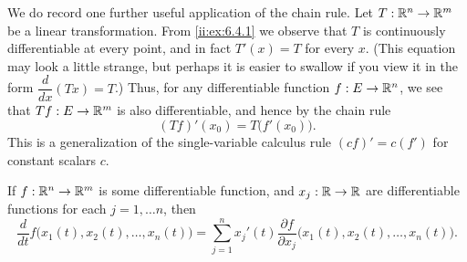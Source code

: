 \begin{note}
  We do record one further useful application of the chain rule.
  Let \(T : \mathbb{R}^n \to \mathbb{R}^m\) be a linear transformation.
  From \cref{ii:ex:6.4.1} we observe that \(T\) is continuously differentiable at every point, and in fact \(T'(x) = T\) for every \(x\).
  (This equation may look a little strange, but perhaps it is easier to swallow if you view it in the form \(\dfrac{d}{dx} (Tx) = T\).)
  Thus, for any differentiable function \(f : E \to \mathbb{R}^n\), we see that \(T f : E \to \mathbb{R}^m\) is also differentiable, and hence by the chain rule
  \[
    (T f)'(x_0) = T\big(f'(x_0)\big).
  \]
  This is a generalization of the single-variable calculus rule \((cf)' = c(f')\) for constant scalars \(c\).
\end{note}

\begin{ac}\label{ii:ac:6.4.1}
  If \(f : \mathbb{R}^n \to \mathbb{R}^m\) is some differentiable function, and \(x_j : \mathbb{R} \to \mathbb{R}\) are differentiable functions for each \(j = 1, \dots n\), then
  \[
    \dfrac{d}{dt} f\big(x_1(t), x_2(t), \dots, x_n(t)\big) = \sum_{j = 1}^n x_j'(t) \dfrac{\partial f}{\partial x_j} \big(x_1(t), x_2(t), \dots, x_n(t)\big).
  \]
\end{ac}

